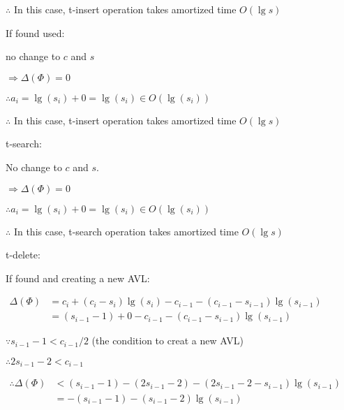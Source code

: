 \documentclass[12pt]{article}
\begin{document}
$\therefore $ In this case, t-insert operation takes amortized time $O(\lg s)$

If found used:

no change to $c$ and $s$

$ \Rightarrow \Delta(\Phi)=0 $

$ \therefore a_i=\lg \left(s_i\right)+0=\lg \left(s_i\right) \in O\left(\lg \left(s_i\right)\right)$


$\therefore$ In this case, t-insert operation takes amortized time $O(\lg s)$

t-search:

No change to $c$ and $s$.

$ \Rightarrow \Delta (\Phi)=0 $

$ \therefore a_i=\lg \left(s_i\right)+0=\lg \left(s_i\right) \in O\left(\lg \left(s_i\right)\right)$


$\therefore$ In this case, t-search operation takes amortized time $O(\lg s)$

t-delete:

If found and creating a new AVL:

$\begin{aligned}
  \Delta(\Phi) & =c_i+\left(c_i-s_i\right)\lg\left( s_i\right)-c_{i-1}-\left(c_{i-1}-s_{i-1}\right) \lg \left(s_{i-1}\right)\\
  &=\left(s_{i-1}-1\right)+0-c_{i-1}-\left(c_{i-1}-s_{i-1}\right) \lg \left(s_{i-1}\right)
\end{aligned} $

$\because s_{i-1}-1<c_{i-1} / 2$ (the condition to creat a new AVL)

$\therefore 2 s_{i-1}-2  < c_{i-1}$

$\begin{aligned}\therefore \Delta(\Phi) & <\left(s_{i-1}-1\right)-\left(2 s_{i-1}-2\right)-\left(2 s_{i-1}-2-s_{i-1}\right) \lg \left(s_{i-1}\right) \\
& =-\left(s_{i-1}-1\right)-\left(s_{i-1}-2\right) \lg \left(s_{i-1}\right)
\end{aligned} $
\end{document}
